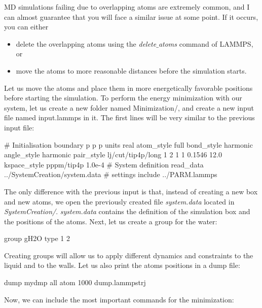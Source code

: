 \noindent \begin{tcolorbox}[colback=mylightblue!5!white,colframe=mylightblue!75!black,title=Dealing with overlapping atoms]
MD simulations failing due to overlapping atoms are
extremely common, and I can almost guarantee that you
will face a similar issue at some point. If it occurs,
you can either
\begin{itemize}
\item delete the overlapping atoms using the \textit{delete$\_$atoms} command of LAMMPS, or
\item move the atoms to more reasonable distances before the simulation starts.
\end{itemize}
\end{tcolorbox}

\noindent Let us move the atoms and place them
in more energetically favorable positions before starting the simulation.
To perform the energy minimization with our system, let us
create a new folder named Minimization/, and create a new
input file named input.lammps in it. The first lines will be
very similar to the previous input file:

\begin{lcverbatim}
# Initialisation
boundary p p p
units real
atom_style full
bond_style harmonic
angle_style harmonic
pair_style lj/cut/tip4p/long 1 2 1 1 0.1546 12.0
kspace_style pppm/tip4p 1.0e-4
# System definition
read_data ../SystemCreation/system.data
# settings
include ../PARM.lammps
\end{lcverbatim}

\noindent The only difference with the previous input is that, instead
of creating a new box and new atoms, we open the
previously created file \textit{system.data} located in \textit{SystemCreation/}.
\textit{system.data} contains the definition of the simulation box and the positions of the atoms.
Next, let us create a group for the water:

\begin{lcverbatim}
group gH2O type 1 2
\end{lcverbatim}

\noindent Creating groups will allow us to apply different dynamics and constraints to the
liquid and to the walls.
Let us also print the atoms positions in a dump file:

\begin{lcverbatim}
dump mydmp all atom 1000 dump.lammpstrj
\end{lcverbatim}

\noindent Now, we can include the most important commands for the
minimization:

